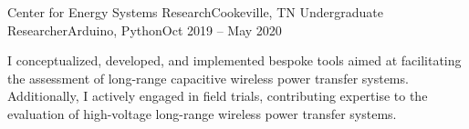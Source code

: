 \Experience
{Center for Energy Systems Research}{Cookeville, TN}
{Undergraduate Researcher}{Arduino, Python}{Oct 2019 – May 2020}

I conceptualized, developed, and implemented bespoke tools aimed at facilitating the assessment of long-range capacitive wireless power transfer systems. Additionally, I actively engaged in field trials, contributing expertise to the evaluation of high-voltage long-range wireless power transfer systems.
